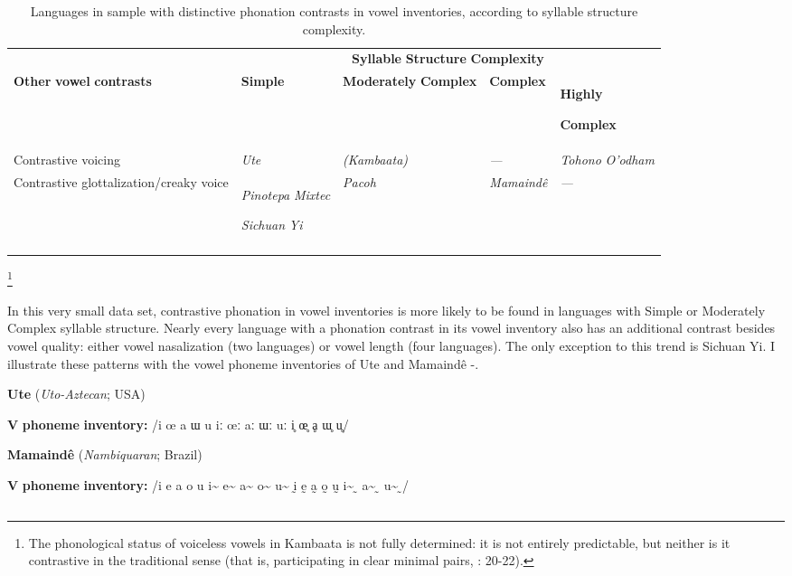 \begin{table}
\begin{tabularx}{\textwidth}{XXXXX}
 & \multicolumn{4}{c}{ \textbf{Syllable} \textbf{Structure} \textbf{Complexity}}\\
\lsptoprule
\textbf{Other} \textbf{vowel} \textbf{contrasts} & \textbf{Simple} & \textbf{Moderately} \textbf{Complex} & \textbf{Complex} & { \textbf{Highly} }

 \textbf{Complex}\\
Contrastive voicing & \textit{Ute} & \textit{(Kambaata)} & \textit{—} & \textit{Tohono} \textit{O’odham}\\
Contrastive glottalization/creaky voice & { \textit{Pinotepa} \textit{Mixtec}}

 \textit{Sichuan} \textit{Yi} & \textit{Pacoh} & \textit{Mamaindê} & \textit{—}\\
\lspbottomrule
\end{tabularx}
\caption{\label{4.5}Languages in sample with distinctive phonation contrasts in vowel inventories, according to syllable structure complexity.}
\footnote{ \textrm{The phonological status of voiceless vowels in Kambaata is not fully determined: it is not entirely predictable, but neither is it contrastive in the traditional sense (that is, participating in clear minimal pairs, \citealt{Treis2008}: 20-22).}}
\end{table}

  In this very small data set, contrastive phonation in vowel inventories is more likely to be found in languages with Simple or Moderately Complex syllable structure. Nearly every language with a phonation contrast in its vowel inventory also has an additional contrast besides vowel quality: either vowel nasalization (two languages) or vowel length (four languages). The only exception to this trend is Sichuan Yi. I illustrate these patterns with the vowel phoneme inventories of Ute and Mamaindê -.

\ea\label{ex:(4.15)}
  \textbf{Ute} (\textit{Uto-Aztecan}; USA)

\textbf{V} \textbf{phoneme} \textbf{inventory:} /i œ a ɯ u iː œː aː ɯː uː i̥ œ̥ ḁ ɯ̥ u̥/
\z

\ea\label{ex:(4.16)}
  \textbf{Mamaindê} (\textit{Nambiquaran}; Brazil)

\textbf{V} \textbf{phoneme} \textbf{inventory:} /i e a o u i\~{}  e\~{}  a\~{}  o\~{}  u\~{}  ḭ ḛ a̰ o̰ ṵ i\~{} ̰ a\~{} ̰ u\~{} ̰/
\z

\subsection{\rmfamily} 
